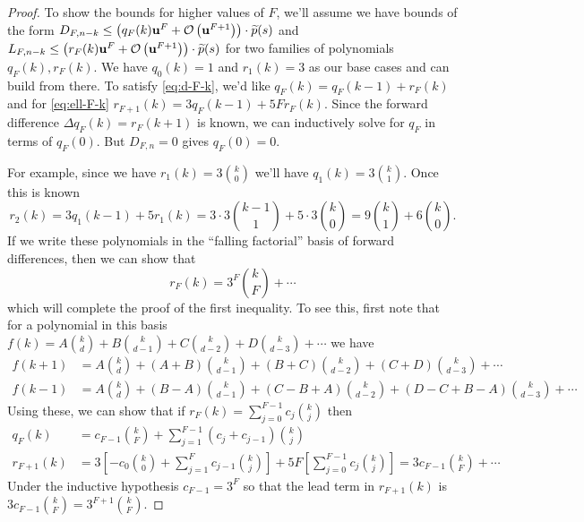 \begin{proof}
To show the bounds for higher values of \(F\), we'll assume we have
bounds of the form
\(D_{F, n - k} \leq \left(q_F(k) \mathbf{u}^F + \mathcal{O}\left(\mathbf{u}^{F + 1}\right)\right) \cdot
\widetilde{p}(s)\) and
\(L_{F, n - k} \leq \left(r_F(k) \mathbf{u}^F + \mathcal{O}\left(\mathbf{u}^{F + 1}\right)\right) \cdot
\widetilde{p}(s)\) for two families of polynomials \(q_F(k), r_F(k)\). We
have \(q_0(k) = 1\) and \(r_1(k) = 3\) as our base cases and can build from
there. To satisfy \eqref{eq:d-F-k}, we'd like
\(q_F(k) = q_F(k - 1) + r_F(k)\)
and for \eqref{eq:ell-F-k}
\(r_{F + 1}(k) = 3 q_F(k - 1) + 5 F r_F(k)\).
Since the forward difference \(\Delta q_F(k) = r_F(k + 1)\) is known,
we can inductively solve for \(q_F\) in terms of \(q_F(0)\). But
\(D_{F, n} = 0\) gives \(q_F(0) = 0\).

For example, since we have \(r_1(k) = 3 \binom{k}{0}\) we'll have
\(q_1(k) = 3 \binom{k}{1}\). Once this is known
\begin{equation}
r_2(k) = 3 q_1(k - 1) + 5 r_1(k) = 3 \cdot 3 \binom{k - 1}{1} +
5 \cdot 3 \binom{k}{0} = 9 \binom{k}{1} + 6 \binom{k}{0}.
\end{equation}
If we write these polynomials in the ``falling factorial'' basis of
forward differences, then we can show that
\begin{equation}
r_F(k) = 3^F \binom{k}{F} + \cdots
\end{equation}
which will complete the proof of the first inequality. To see this, first
note that for a polynomial in this basis
\(f(k) = A \binom{k}{d} + B \binom{k}{d - 1} + C \binom{k}{d - 2} +
D \binom{k}{d - 3} + \cdots\) we have
\begin{align}
f(k + 1) &= A \binom{k}{d} + (A + B) \binom{k}{d - 1} +
  (B + C) \binom{k}{d - 2} + (C + D) \binom{k}{d - 3} + \cdots \\
f(k - 1) &= A \binom{k}{d} + (B - A) \binom{k}{d - 1} +
  (C - B + A) \binom{k}{d - 2} + (D - C + B - A) \binom{k}{d - 3} + \cdots
\end{align}
Using these, we can show that if
\(r_F(k) = \sum_{j = 0}^{F - 1} c_j \binom{k}{j}\) then
\begin{align}
q_F(k) &= c_{F - 1} \binom{k}{F} + \sum_{j = 1}^{F - 1}
  (c_j + c_{j - 1}) \binom{k}{j} \\
r_{F + 1}(k) &= 3 \left[-c_0 \binom{k}{0} +
  \sum_{j = 1}^F c_{j - 1} \binom{k}{j}\right] +
5F \left[\sum_{j = 0}^{F - 1} c_j \binom{k}{j}\right] =
3 c_{F - 1} \binom{k}{F} + \cdots
\end{align}
Under the inductive hypothesis \(c_{F - 1} = 3^F\) so that
the lead term in \(r_{F + 1}(k)\) is \(3 c_{F - 1} \binom{k}{F}
= 3^{F + 1} \binom{k}{F}\).


\end{proof}
